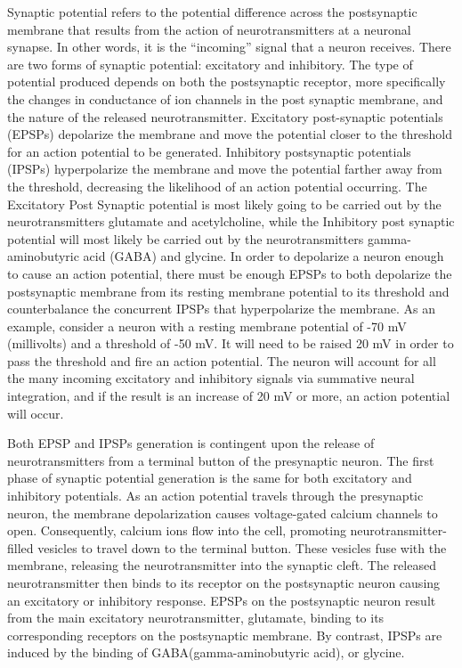 \documentclass[]{book}
\begin{document}
Synaptic potential refers to the potential difference across the postsynaptic membrane that results from the action of neurotransmitters at a neuronal synapse. In other words, it is the ``incoming'' signal that a neuron receives. There are two forms of synaptic potential: excitatory and inhibitory. The type of potential produced depends on both the postsynaptic receptor, more specifically the changes in conductance of ion channels in the post synaptic membrane, and the nature of the released neurotransmitter. Excitatory post-synaptic potentials (EPSPs) depolarize the membrane and move the potential closer to the threshold for an action potential to be generated. Inhibitory postsynaptic potentials (IPSPs) hyperpolarize the membrane and move the potential farther away from the threshold, decreasing the likelihood of an action potential occurring. The Excitatory Post Synaptic potential is most likely going to be carried out by the neurotransmitters glutamate and acetylcholine, while the Inhibitory post synaptic potential will most likely be carried out by the neurotransmitters gamma-aminobutyric acid (GABA) and glycine. In order to depolarize a neuron enough to cause an action potential, there must be enough EPSPs to both depolarize the postsynaptic membrane from its resting membrane potential to its threshold and counterbalance the concurrent IPSPs that hyperpolarize the membrane. As an example, consider a neuron with a resting membrane potential of -70 mV (millivolts) and a threshold of -50 mV. It will need to be raised 20 mV in order to pass the threshold and fire an action potential. The neuron will account for all the many incoming excitatory and inhibitory signals via summative neural integration, and if the result is an increase of 20 mV or more, an action potential will occur.

Both EPSP and IPSPs generation is contingent upon the release of neurotransmitters from a terminal button of the presynaptic neuron. The first phase of synaptic potential generation is the same for both excitatory and inhibitory potentials. As an action potential travels through the presynaptic neuron, the membrane depolarization causes voltage-gated calcium channels to open. Consequently, calcium ions flow into the cell, promoting neurotransmitter-filled vesicles to travel down to the terminal button. These vesicles fuse with the membrane, releasing the neurotransmitter into the synaptic cleft. The released neurotransmitter then binds to its receptor on the postsynaptic neuron causing an excitatory or inhibitory response. EPSPs on the postsynaptic neuron result from the main excitatory neurotransmitter, glutamate, binding to its corresponding receptors on the postsynaptic membrane. By contrast, IPSPs are induced by the binding of GABA(gamma-aminobutyric acid), or glycine.
\end{document}
